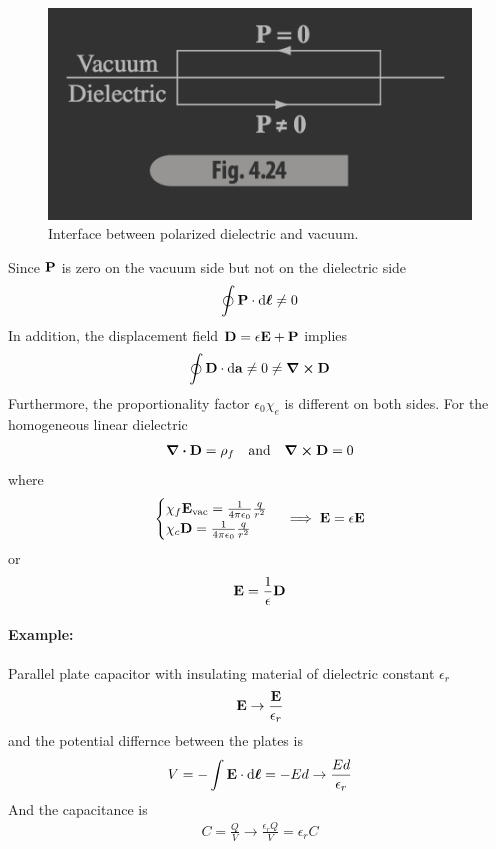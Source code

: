 \documentclass[../main.tex]{subfiles}
\begin{document}
\begin{figure}[ht]
    \centering
    \includegraphics[width=0.5\linewidth]{fig4_24.png}
    \caption{Interface between polarized dielectric and vacuum.}
    \label{fig:4_24}
\end{figure}

Since $\vb P$ is zero on the vacuum side but not on the dielectric side
\begin{align*}
    \oint \vb P \cdot \dd{\vb*\ell} \neq 0
\end{align*}
In addition, the displacement field $\vb D = \epsilon \vb E + \vb P$ implies
\begin{align*}
    \oint \vb D \cdot \dd{\vb a} \neq 0 \neq \curl \vb D
\end{align*}
Furthermore, the proportionality factor $\epsilon_0 \chi_e$ is different on both sides.
For the homogeneous linear dielectric
\begin{align*}
    \div \vb D = \rho_f \qand \curl \vb D = 0
\end{align*}
where 
\begin{align*}
    \begin{cases}
        \chi_f \vb E_\text{vac} = \frac{1}{4\pi\epsilon_0} \frac{q}{r^2} \\
        \chi_c \vb D = \frac{1}{4\pi\epsilon_0} \frac{q}{r^2}
    \end{cases}
    \implies \vb E = \epsilon \vb E
\end{align*}
or
\begin{align*}
    \vb E = \frac{1}{\epsilon} \vb D
\end{align*}

\paragraph{Example:} Parallel plate capacitor with insulating material of dielectric constant $\epsilon_r$
\begin{align*}
    \vb E \to \frac{\vb E}{\epsilon_r} 
\end{align*}
and the potential differnce between the plates is
\begin{align*}
    V = - \int \vb E \cdot \dd{\vb*\ell} = - Ed \to \frac{Ed}{\epsilon_r}
\end{align*}
And the capacitance is
\begin{align*}
    C = \frac{Q}{V} \to \frac{\epsilon_r Q}{V} = \epsilon_r C
\end{align*}
\end{document}
